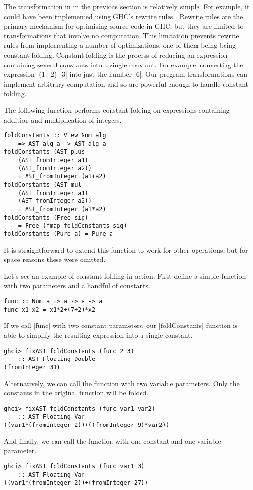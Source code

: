 \documentclass[preprint]{sigplanconf}
\theoremstyle{definition}
\begin{document}
The transformation in in the previous section is relatively simple.
For example, it could have been implemented using GHC's rewrite rules \cite{jones2001playing}.
Rewrite rules are the primary mechanism for optimising source code in GHC,
but they are limited to transformations that involve no computation.
This limitation prevents rewrite rules from implementing a number of optimizations,
one of them being being constant folding.
Constant folding is the process of reducing an expression containing several constants into a single constant.
For example, converting the expression |(1+2)+3| into just the number |6|.
Our program transformations can implement arbitrary computation and so are powerful enough to handle constant folding.

The following function performs constant folding on expressions containing addition and multiplication of integers.
\begin{lstlisting}
foldConstants :: View Num alg
    => AST alg a -> AST alg a
foldConstants (AST_plus
    (AST_fromInteger a1)
    (AST_fromInteger a2))
    = AST_fromInteger (a1+a2)
foldConstants (AST_mul
    (AST_fromInteger a1)
    (AST_fromInteger a2))
    = AST_fromInteger (a1*a2)
foldConstants (Free sig)
    = Free (fmap foldConstants sig)
foldConstants (Pure a) = Pure a
\end{lstlisting}
It is straightforward to extend this function to work for other operations,
but for space reasons these were omitted.

Let's see an example of constant folding in action.
First define a simple function with two parameters and a handful of constants.
\begin{lstlisting}
func :: Num a => a -> a -> a
func x1 x2 = x1*2+(7+2)*x2
\end{lstlisting}
If we call |func| with two constant parameters,
our |foldConstants| function is able to simplify the resulting expression into a single constant.
\begin{lstlisting}
ghci> fixAST foldConstants (func 2 3)
    :: AST Floating Double
(fromInteger 31)
\end{lstlisting}
Alternatively, we can call the function with two variable parameters.
Only the constants in the original function will be folded.
\begin{lstlisting}
ghci> fixAST foldConstants (func var1 var2)
    :: AST Floating Var
((var1*(fromInteger 2))+((fromInteger 9)*var2))
\end{lstlisting}
And finally, we can call the function with one constant and one variable parameter.
\begin{lstlisting}
ghci> fixAST foldConstants (func var1 3)
    :: AST Floating Var
((var1*(fromInteger 2))+(fromInteger 27))
\end{lstlisting}
\end{document}
